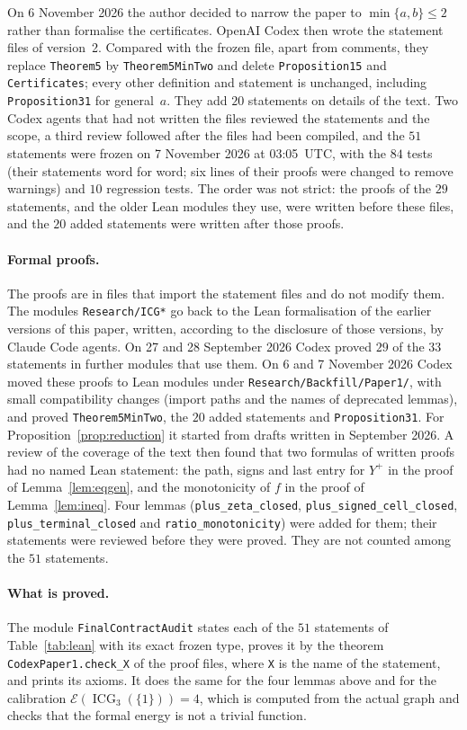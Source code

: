 \documentclass[11pt]{article}
\theoremstyle{remark}
\newcommand{\ICG}{\operatorname{ICG}}
\newcommand{\E}{\mathcal E}
\begin{document}
On 6 November 2026 the author decided to narrow the paper to
$\min\{a,b\}\le2$ rather than formalise the certificates. OpenAI Codex then wrote
the statement files of version~2. Compared with the frozen file, apart from comments,
they replace \texttt{Theorem5} by \texttt{Theorem5MinTwo} and delete
\texttt{Proposition15} and \texttt{Certificates}; every other definition and
statement is unchanged, including \texttt{Proposition31} for general~$a$. They add
$20$ statements on details of the text. Two Codex agents that had not written the
files reviewed the statements and the scope, a third review followed after the
files had been compiled, and the $51$ statements were frozen on 7 November 2026 at
03:05~UTC, with the $84$ tests (their statements word for word; six lines of their
proofs were changed to remove warnings) and $10$ regression tests. The order was
not strict: the proofs of the $29$ statements, and the older Lean modules they use,
were written before these files, and the $20$ added statements were written after
those proofs.

\paragraph{Formal proofs.}
The proofs are in files that import the statement files and do not modify them.
The modules \texttt{Research/ICG*} go back to the Lean formalisation of the earlier
versions of this paper, written, according to the disclosure of those versions, by
Claude Code agents. On 27 and 28 September 2026
Codex proved $29$ of the $33$ statements in further modules that use them. On
6 and 7 November 2026 Codex moved these proofs to Lean modules under
\texttt{Research/Backfill/Paper1/}, with small compatibility changes (import paths
and the names of deprecated lemmas), and proved \texttt{Theorem5MinTwo}, the $20$
added statements and \texttt{Proposition31}. For Proposition~\ref{prop:reduction} it
started from drafts written in September 2026. A review of the coverage
of the text then found that two formulas of written proofs had no named Lean
statement: the path, signs and last entry for $Y^+$ in the proof of
Lemma~\ref{lem:eqgen}, and the monotonicity of $f$ in the proof of
Lemma~\ref{lem:ineq}. Four lemmas (\texttt{plus\_zeta\_closed},
\texttt{plus\_signed\_cell\_closed}, \texttt{plus\_terminal\_closed} and
\texttt{ratio\_monotonicity}) were added for them; their statements were reviewed
before they were proved. They are not counted among the $51$ statements.

\paragraph{What is proved.}
The module \texttt{FinalContractAudit} states each of the $51$ statements of
Table~\ref{tab:lean} with its exact frozen type, proves it by the theorem
\texttt{CodexPaper1.check\_X} of the proof files, where \texttt{X} is the name of the
statement, and prints its axioms. It does the same for the four lemmas above and
for the calibration $\E(\ICG_3(\{1\}))=4$, which is computed from the actual graph
and checks that the formal energy is not a trivial function.
\end{document}
